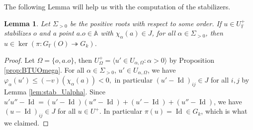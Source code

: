 \documentclass[12pt]{amsart}
\newcommand{\F}{\mathbb{F} }
\newcommand{\A}{\mathbb{A}}
\newcommand{\Id}{\operatorname{Id} }
\numberwithin{equation}{section}
\newtheorem{lemma}[theorem]{Lemma}
\theoremstyle{remark} %
\begin{document}
The following Lemma will help us with the computation of the stabilizers.

\begin{lemma}\label{lem:neg_kernel}
Let $\Sigma_{>0}$ be the positive roots with respect to some order. If $u\in U_\F^+$ stabilizes $o$ and a point $a.o \in \A$ with $\chi_{\alpha}(a) \in J$, for all $\alpha \in \Sigma_{>0}$, then $u \in \operatorname{ker}(\pi \colon G_\F(O) \twoheadrightarrow G_k)$.
\end{lemma}
\begin{proof}
	Let $\Omega = \{o,a.o\}$, then $U_\Omega^{+} = \langle u' \in U_{\alpha,\Omega} \colon \alpha > 0 \rangle$ by Proposition \ref{prop:BTUOmega}. For all $\alpha\in \Sigma_{>0}$, $u' \in U_{\alpha,\Omega}$, we have
	$
	\varphi_{\alpha}(u') \leq (-v)(\chi_{\alpha}(a)) < 0,
	$
	in particular $(u'-\Id)_{ij} \in J$ for all $i,j$ by Lemma \ref{lem:stab_Ualpha}. Since $u'u''-\Id = (u'-\Id)(u''-\Id) + (u' - \Id) + (u'' - \Id)$, we have $(u-\Id)_{ij} \in J$ for all $u\in U^+$. In particular $\pi(u) = \Id \in G_k$, which is what we claimed.
\end{proof}
\end{document}
